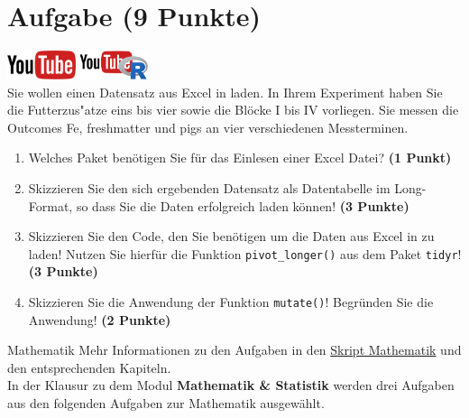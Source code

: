\documentclass[a4paper, 10pt]{scrartcl}\usepackage[]{graphicx}\usepackage[]{xcolor}
\begin{document}
 
\clearpage

\section{Aufgabe \hfill (9 Punkte)}

\hfill\href{https://youtu.be/Oxa97uqNyCQ}{\includegraphics[width =
  2cm]{img/youtube}}
\hspace{2Ex}
\href{https://youtu.be/ymFfBkWyb8s}{\includegraphics[width =
  2cm]{img/youtube_R}}\\[1Ex]




Sie wollen einen Datensatz aus Excel in \Rlogo laden. In Ihrem Experiment haben Sie
die Futterzus{"a}tze eins bis vier sowie die Bl{\"o}cke I bis IV
vorliegen. Sie messen die Outcomes Fe, freshmatter und pigs an vier verschiedenen Messterminen.

\begin{enumerate}
\item Welches \Rlogo Paket ben{\"o}tigen Sie f{\"u}r das Einlesen einer Excel Datei?
  \textbf{(1 Punkt)} 
\item Skizzieren Sie den sich ergebenden Datensatz als Datentabelle im
  Long-Format, so dass Sie die Daten erfolgreich \Rlogo laden k{\"o}nnen!
  \textbf{(3 Punkte)}
\item Skizzieren Sie den \Rlogo Code, den Sie ben{\"o}tigen um die Daten aus
  Excel in \Rlogo zu laden! Nutzen Sie hierf{\"u}r die Funktion
  \texttt{pivot\_longer()} aus dem \Rlogo Paket \texttt{tidyr}! \textbf{(3
    Punkte)}
\item Skizzieren Sie die Anwendung der Funktion \texttt{mutate()}!
  Begr{\"u}nden Sie die Anwendung! \textbf{(2 Punkte)}
\end{enumerate}


 
\clearpage
\begin{graybox}{Mathematik}
Mehr Informationen zu den Aufgaben in den \href{https://jkruppa.github.io/math/}{Skript Mathematik} und den entsprechenden Kapiteln.\\

In der Klausur zu dem Modul \textbf{Mathematik \& Statistik} werden drei Aufgaben aus den folgenden Aufgaben zur Mathematik ausgewählt. \\
\end{graybox}
\clearpage
\end{document}
